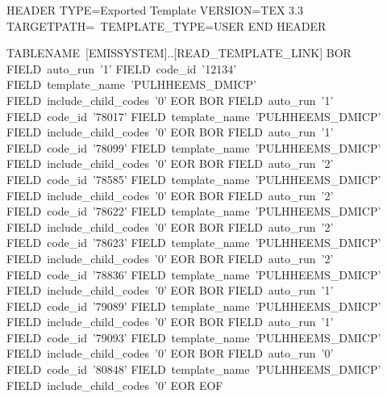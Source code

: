 HEADER
TYPE=Exported Template
VERSION=TEX 3.3
TARGETPATH=\DMICP\
TEMPLATE_TYPE=USER
END HEADER

TABLENAME~[EMISSYSTEM]..[READ_TEMPLATE_LINK]
  BOR
    FIELD~auto_run~'1'
    FIELD~code_id~'12134'
    FIELD~template_name~'PULHHEEMS_DMICP'
    FIELD~include_child_codes~'0'
  EOR
  BOR
    FIELD~auto_run~'1'
    FIELD~code_id~'78017'
    FIELD~template_name~'PULHHEEMS_DMICP'
    FIELD~include_child_codes~'0'
  EOR
  BOR
    FIELD~auto_run~'1'
    FIELD~code_id~'78099'
    FIELD~template_name~'PULHHEEMS_DMICP'
    FIELD~include_child_codes~'0'
  EOR
  BOR
    FIELD~auto_run~'2'
    FIELD~code_id~'78585'
    FIELD~template_name~'PULHHEEMS_DMICP'
    FIELD~include_child_codes~'0'
  EOR
  BOR
    FIELD~auto_run~'2'
    FIELD~code_id~'78622'
    FIELD~template_name~'PULHHEEMS_DMICP'
    FIELD~include_child_codes~'0'
  EOR
  BOR
    FIELD~auto_run~'2'
    FIELD~code_id~'78623'
    FIELD~template_name~'PULHHEEMS_DMICP'
    FIELD~include_child_codes~'0'
  EOR
  BOR
    FIELD~auto_run~'2'
    FIELD~code_id~'78836'
    FIELD~template_name~'PULHHEEMS_DMICP'
    FIELD~include_child_codes~'0'
  EOR
  BOR
    FIELD~auto_run~'1'
    FIELD~code_id~'79089'
    FIELD~template_name~'PULHHEEMS_DMICP'
    FIELD~include_child_codes~'0'
  EOR
  BOR
    FIELD~auto_run~'1'
    FIELD~code_id~'79093'
    FIELD~template_name~'PULHHEEMS_DMICP'
    FIELD~include_child_codes~'0'
  EOR
  BOR
    FIELD~auto_run~'0'
    FIELD~code_id~'80848'
    FIELD~template_name~'PULHHEEMS_DMICP'
    FIELD~include_child_codes~'0'
  EOR
EOF

